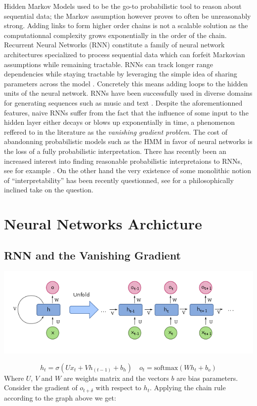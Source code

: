 
Hidden Markov Models used to be the go-to probabilistic tool to reason about
sequential data; the Markov assumption however proves to often be unreasonably
strong. Adding links to form higher order chains is not a scalable solution as
the computationnal complexity grows exponentially in the order of the chain.
Recurrent Neural Networks (RNN) constitute a family of neural network
architectures specialized to process sequential data which can forfeit
Markovian assumptions while remaining tractable.  RNNs can track longer range
dependencies while staying tractable by leveraging the simple idea of sharing
parameters across the model \cite{deeplearning}.  Concretely this means adding
loops to the hidden units of the neural network.  RNNs have been successfully
used in diverse domains for generating sequences such as music and text
\cite{gravesGenerating}.  Despite the aforementionned features, naive RNNs
suffer from the fact that the influence of some input to the hidden layer
either decays or blows up exponentially in time, a phenomenon reffered to in
the literature as the \textit{vanishing gradient problem}.  The cost of
abandonning probabilistic models such as the HMM in favor of neural networks is
the loss of a fully probabilistic interpretation. There has recently been an
increased interest into finding reasonable probabilistic interpretaions to
RNNs, see for example \cite{inter}. On the other hand the very existence of
some monolithic notion of ``interpretability'' has been recently questionned,
see \cite{mythos} for a philosophically inclined take on the question.

\section{Neural Networks Archicture}
\subsection{RNN and the Vanishing Gradient}
\begin{center}
    \includegraphics[width=\columnwidth]{RNN.png}
\end{center}
\begin{equation*}
    h_t = \sigma(U x_t + V h_{(t-1)} + b_h)
    \quad o_t = \text{softmax}(W h_t + b_o)
\end{equation*}
Where $ U$, $V$ and $W$ are weights matrix and the vectors $b$ are bias
parameters. Consider the gradient of $o_{t + \delta}$ with respect
to $h_t$. Applying the chain rule according to the graph above we get:

